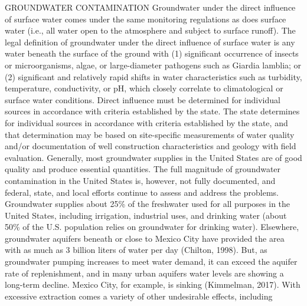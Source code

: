 \documentclass{article}
\begin{document}
GROUNDWATER CONTAMINATION Groundwater under the direct influence of
surface water comes under the same monitoring regulations as does
surface water (i.e., all water open to the atmosphere and subject to
surface runoff). The legal definition of groundwater under the direct
influence of surface water is any water beneath the surface of the
ground with (1) significant occurrence of insects or microorganisms,
algae, or large-diameter pathogens such as Giardia lamblia; or (2)
significant and relatively rapid shifts in water characteristics such as
turbidity, temperature, conductivity, or pH, which closely correlate to
climatological or surface water conditions. Direct influence must be
determined for individual sources in accordance with criteria
established by the state. The state determines for individual sources in
accordance with criteria established by the state, and that
determination may be based on site-specific measurements of water
quality and/or documentation of well construction characteristics and
geology with field evaluation. Generally, most groundwater supplies in
the United States are of good quality and produce essential quantities.
The full magnitude of groundwater contamination in the United States is,
however, not fully documented, and federal, state, and local efforts
continue to assess and address the problems. Groundwater supplies about
25\% of the freshwater used for all purposes in the United States,
including irrigation, industrial uses, and drinking water (about 50\% of
the U.S. population relies on groundwater for drinking water).
Elsewhere, groundwater aquifers beneath or close to Mexico City have
provided the area with as much as 3 billion liters of water per day
(Chilton, 1998). But, as groundwater pumping increases to meet water
demand, it can exceed the aquifer rate of replenishment, and in many
urban aquifers water levels are showing a long-term decline. Mexico
City, for example, is sinking (Kimmelman, 2017). With excessive
extraction comes a variety of other undesirable effects, including
\end{document}
